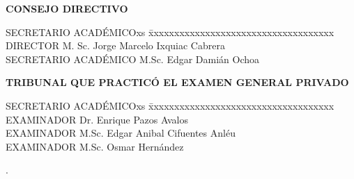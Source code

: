 \begin{figure}[h]
  \begin{center}
  \end{center}
\end{figure}

\begin{center}
\textbf{CONSEJO DIRECTIVO}
\end{center}

{\doublespacing{}
\begin{tabbing}
  SECRETARIO ACADÉMICOxs \= xxxxxxxxxxxxxxxxxxxxxxxxxxxxxxxxxxxx  \kill
  DIRECTOR \> M. Sc. Jorge Marcelo Ixquiac Cabrera \\
  SECRETARIO ACADÉMICO \> M.Sc. Edgar Damián Ochoa
\end{tabbing}

\vspace{24pt}

\begin{center}
\textbf{TRIBUNAL QUE PRACTICÓ EL EXAMEN GENERAL PRIVADO}
\end{center}

\begin{tabbing}
  SECRETARIO ACADÉMICOxs \= xxxxxxxxxxxxxxxxxxxxxxxxxxxxxxxxxxxx  \kill
  EXAMINADOR \> Dr\@. Enrique Pazos Avalos\\
  EXAMINADOR \> M.Sc. Edgar Anibal Cifuentes Anléu  \\
  EXAMINADOR \> M.Sc. Osmar Hernández \\
\end{tabbing}
\par}

\newpage
\textcolor[rgb]{1,1,1}{.} 

\thispagestyle{empty}
\newpage